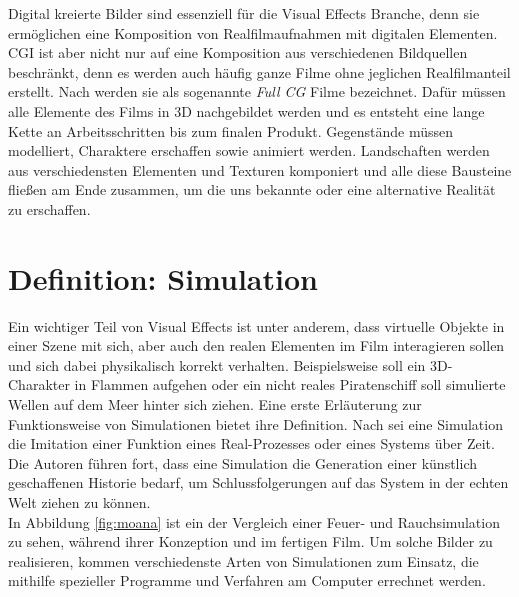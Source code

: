 Digital kreierte Bilder sind essenziell für die Visual Effects Branche, denn sie ermöglichen eine Komposition von Realfilmaufnahmen mit digitalen Elementen. CGI ist aber nicht nur auf eine Komposition aus verschiedenen Bildquellen beschränkt, denn es werden auch häufig ganze Filme ohne jeglichen Realfilmanteil erstellt. Nach \citet[]{garcia-no-date} werden sie als sogenannte \textit{Full CG} Filme bezeichnet. Dafür müssen alle Elemente des Films in 3D nachgebildet werden und es entsteht eine lange Kette an Arbeitsschritten bis zum finalen Produkt. Gegenstände müssen modelliert, Charaktere erschaffen sowie animiert werden. Landschaften werden aus verschiedensten Elementen und Texturen komponiert und alle diese Bausteine fließen am Ende zusammen, um die uns bekannte oder eine alternative Realität zu erschaffen. 

\section{Definition: Simulation}
Ein wichtiger Teil von Visual Effects ist unter anderem, dass virtuelle Objekte in einer Szene mit sich, aber auch den realen Elementen im Film interagieren sollen und sich dabei physikalisch korrekt verhalten. Beispielsweise soll ein 3D-Charakter in Flammen aufgehen oder ein nicht reales Piratenschiff soll simulierte Wellen auf dem Meer hinter sich ziehen. Eine erste Erläuterung zur Funktionsweise von Simulationen bietet ihre Definition. Nach \citet[]{Discrete-Event} sei eine Simulation die Imitation einer Funktion eines Real-Prozesses oder eines Systems über Zeit. Die Autoren führen fort, dass eine Simulation die Generation einer künstlich geschaffenen Historie bedarf, um Schlussfolgerungen auf das System in der echten Welt ziehen zu können.\\

In Abbildung \ref{fig:moana} ist ein der Vergleich einer Feuer- und Rauchsimulation zu sehen, während ihrer Konzeption und im fertigen Film. Um solche Bilder zu realisieren, kommen verschiedenste Arten von Simulationen zum Einsatz, die mithilfe spezieller Programme und Verfahren am Computer errechnet werden. \\

